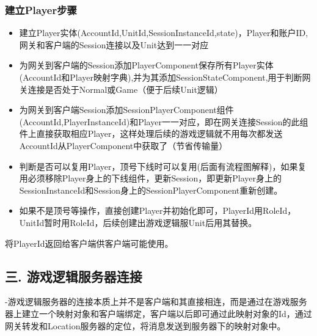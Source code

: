 \documentclass[9pt, b5paper]{article}
\begin{document}
\subsubsection{建立Player步骤}
\label{sec-3-2-4}
\begin{itemize}
\item 建立Player实体(AccountId,UnitId,SessionInstanceId,state)，Player和账户ID,网关和客户端的Session连接以及Unit达到一一对应
\item 为网关到客户端的Session添加PlayerComponent保存所有Player实体(AccountId和Player映射字典),并为其添加SessionStateComponent,用于判断网关连接是否处于Normal或Game（便于后续Unit逻辑）
\item 为网关到客户端Session添加SessionPlayerComponent组件(AccountId,PlayerInstanceId)和Player一一对应，即在网关连接Session的此组件上直接获取相应Player，这样处理后续的游戏逻辑就不用每次都发送AccountId从PlayerComponent中获取了（节省传输量）
\item 判断是否可以复用Player，顶号下线时可以复用(后面有流程图解释)，如果复用必须移除Player身上的下线组件，更新Session，即更新Player身上的SessionInstanceId和Session身上的SessionPlayerComponent重新创建。
\item 如果不是顶号等操作，直接创建Player并初始化即可，PlayerId用RoleId，UnitId暂时用RoleId，后续创建出游戏逻辑服Unit后用其替换。
\end{itemize}
将PlayerId返回给客户端供客户端可能使用。
\subsection{三. 游戏逻辑服务器连接}
\label{sec-3-3}
-​ 游戏逻辑服务器的连接本质上并不是客户端和其直接相连，而是通过在游戏服务器上建立一个映射对象和客户端绑定，客户端以后即可通过此映射对象的Id，通过网关转发和Location服务器的定位，将消息发送到服务器下的映射对象中。
\end{document}

